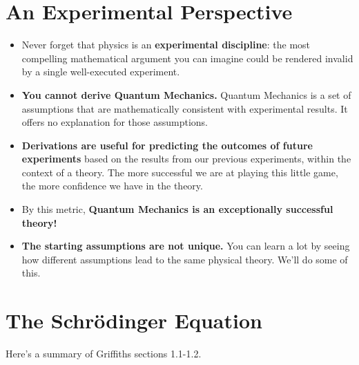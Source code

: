 \documentclass[12pt]{book}
\begin{document}
\section{An Experimental Perspective}

\begin{itemize}

\item Never forget that physics is an {\bf experimental discipline}: the most compelling mathematical argument you can imagine could be rendered invalid by a single well-executed experiment.  

\item {\bf You cannot derive Quantum Mechanics.}  Quantum Mechanics is a set
of assumptions that are mathematically consistent with experimental results.
It offers no explanation for those assumptions.

\item {\bf Derivations are useful for predicting the outcomes of future
experiments} based on the results from our previous experiments, within
the context of a theory.  The more successful we are at playing this little
game, the more confidence we have in the theory.

\item By this metric, {\bf Quantum Mechanics is an exceptionally successful theory!}

\item {\bf The starting assumptions are not unique.} You can learn
a lot by seeing how different assumptions lead to the same physical
theory.  We'll do some of this.

\end{itemize}

\section{The Schr\"odinger Equation}

Here's a summary of Griffiths sections 1.1-1.2.
\end{document}
